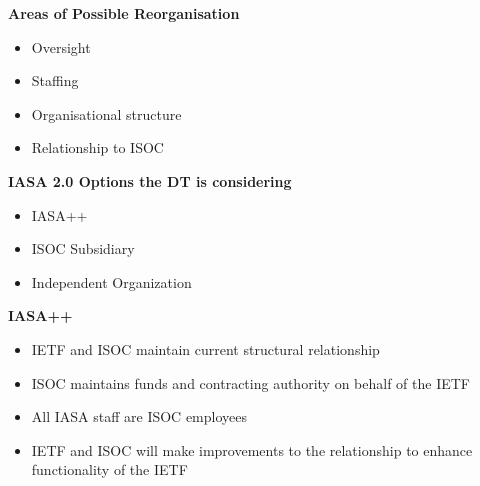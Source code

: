 \documentclass[helvetica]{seminar}
\newcommand{\heading}[1]{%
  \begin{center} 
    \large\bf 
    #1 
  \end{center} 
  \vspace{.4 in}}
\begin{document}
\begin{slide}

\heading{Areas of Possible Reorganisation}
\begin{itemize}
\item Oversight
\item Staffing
\item Organisational structure
\item Relationship to ISOC
\end{itemize}
\end{slide}

\begin{slide}

\heading{IASA 2.0 Options the DT is considering}

\begin{itemize}
\item IASA++
\item ISOC Subsidiary
\item Independent Organization
\end{itemize}

\end{slide}

\begin{slide}

\heading{IASA++}

\begin{itemize}
\item IETF and ISOC maintain current structural relationship
\item ISOC maintains funds and contracting authority on behalf of the IETF
\item All IASA staff are ISOC employees
\item IETF and ISOC will make improvements to the relationship to enhance functionality of the IETF
\end{itemize}

\end{slide}
\end{document}
